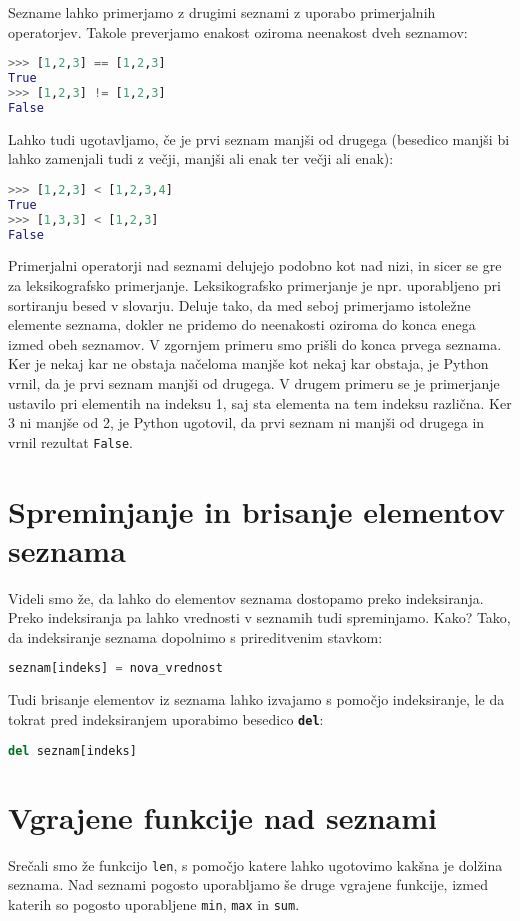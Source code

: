 Sezname lahko primerjamo z drugimi seznami z uporabo primerjalnih operatorjev. Takole preverjamo enakost oziroma neenakost dveh seznamov:
\begin{lstlisting}[language=Python, showstringspaces=false]
>>> [1,2,3] == [1,2,3]
True
>>> [1,2,3] != [1,2,3]
False
\end{lstlisting}
Lahko tudi ugotavljamo, če je prvi seznam manjši od drugega (besedico manjši bi lahko zamenjali tudi z večji, manjši ali enak ter večji ali enak):
\begin{lstlisting}[language=Python, showstringspaces=false]
>>> [1,2,3] < [1,2,3,4]
True
>>> [1,3,3] < [1,2,3]
False
\end{lstlisting}
Primerjalni operatorji nad seznami delujejo podobno kot nad nizi, in sicer se gre za leksikografsko primerjanje. Leksikografsko primerjanje je npr. uporabljeno pri sortiranju besed v slovarju. Deluje tako, da med seboj primerjamo istoležne elemente seznama, dokler ne pridemo do neenakosti oziroma do konca enega izmed obeh seznamov. V zgornjem primeru smo prišli do konca prvega seznama. Ker je nekaj kar ne obstaja načeloma manjše kot nekaj kar obstaja, je Python vrnil, da je prvi seznam manjši od drugega. V drugem primeru se je primerjanje ustavilo pri elementih na indeksu 1, saj sta elementa na tem indeksu različna. Ker 3 ni manjše od 2, je Python ugotovil, da prvi seznam ni manjši od drugega in vrnil rezultat \texttt{False}.

\section{Spreminjanje in brisanje elementov seznama}

Videli smo že, da lahko do elementov seznama dostopamo preko indeksiranja. Preko indeksiranja pa lahko vrednosti v seznamih tudi spreminjamo. Kako? Tako, da indeksiranje seznama dopolnimo s prireditvenim stavkom:
\begin{lstlisting}[language=Python, showstringspaces=false]
seznam[indeks] = nova_vrednost
\end{lstlisting}

Tudi brisanje elementov iz seznama lahko izvajamo s pomočjo indeksiranje, le da tokrat pred indeksiranjem uporabimo besedico \textbf{\texttt{del}}:
\begin{lstlisting}[language=Python, showstringspaces=false]
del seznam[indeks]
\end{lstlisting}

\section{Vgrajene funkcije nad seznami}
Srečali smo že funkcijo \texttt{len}, s pomočjo katere lahko ugotovimo kakšna je dolžina seznama. Nad seznami pogosto uporabljamo še druge vgrajene funkcije, izmed katerih so pogosto uporabljene \texttt{min}, \texttt{max} in \texttt{sum}.

